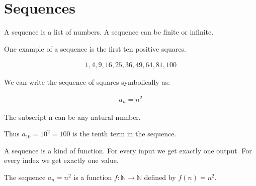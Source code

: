 \documentclass{article}
\begin{document}
\section{Sequences}
\begin{flushleft}
A sequence is a list of numbers. A sequence can be finite or infinite.
\end{flushleft}
\begin{flushleft}
One example of a sequence is the first ten positive squares.
\end{flushleft}
\begin{align*}
1, 4, 9, 16, 25, 36, 49, 64, 81, 100
\end{align*}
\begin{flushleft}
We can write the sequence of squares symbolically as:
\end{flushleft}
\begin{align*}
a_{n} = n^2 
\end{align*}
\begin{flushleft}
The subscript n can be any natural number. 
\end{flushleft}
\begin{flushleft}
Thus $a_{10} = 10^2 = 100$ is the tenth term in the sequence.
\end{flushleft}
\begin{flushleft}
A sequence is a kind of function. For every input we get exactly one output. For every index we get exactly one value.
\end{flushleft}
\begin{flushleft}
The sequence $a_{n} = n^2$ is a function $f : \mathbb{N} \rightarrow \mathbb{N}$ defined by $f(n) = n^2$.
\end{flushleft}
\end{document}
